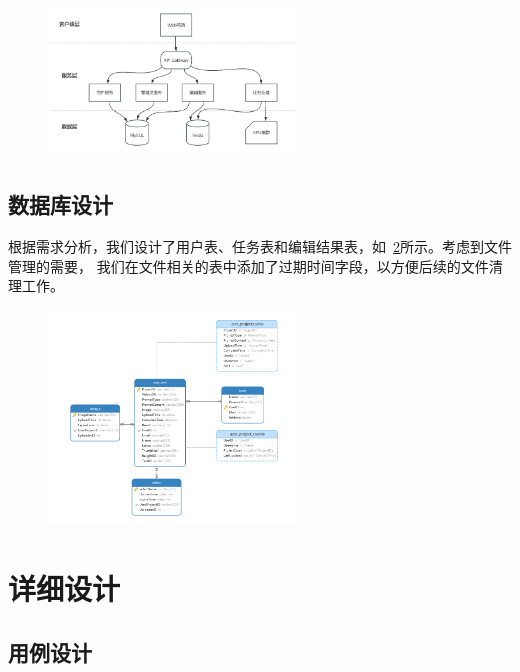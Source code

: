 \begin{figure}[ht]
    \centering
    \includegraphics[width=0.6\textwidth]{source/img/system_structure.png}
    \label{fig:system_structure}
\end{figure}

\subsection{数据库设计}

根据需求分析，我们设计了用户表、任务表和编辑结果表，如~\ref{fig:database_design}所示。考虑到文件管理的需要，
我们在文件相关的表中添加了过期时间字段，以方便后续的文件清理工作。

\begin{figure}[ht]
    \centering
    \includegraphics[width=0.6\textwidth]{source/img/database_design.png}
    \label{fig:database_design}
\end{figure}

\section{详细设计}

\subsection{用例设计}

